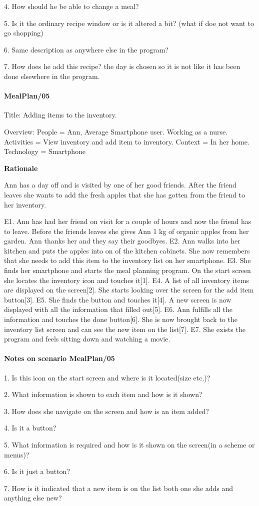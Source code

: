 4. How should he be able to change a meal?

5. Is it the ordinary recipe window or is it altered a bit? (what if doe not want to go shopping) 

6. Same description as anywhere else in the program?

7. How does he add this recipe? the day is chosen so it is not like it has been done elsewhere in the program.

\paragraph{MealPlan/05}

Title: Adding items to the inventory.

Overview:
	People = Ann, Average Smartphone user. Working as a nurse.
	Activities = View inventory and add item to inventory.
	Context = In her home.
	Technology = Smartphone

\textbf{Rationale}

Ann has a day off and is visited by one of her good friends. After the friend leaves she wants to add the fresh apples that she has gotten from the friend to her inventory.

	E1. Ann has had her friend on visit for a couple of hours and now the friend has to leave. Before the friends leaves she gives Ann 1 kg of organic apples from her garden. Ann thanks her and they say their goodbyes.
	E2. Ann walks into her kitchen and puts the apples into on of the kitchen cabinets. She now remembers that she needs to add this item to the inventory list on her smartphone.
	E3. She finds her smartphone and starts the meal planning program. On the start screen she locates the inventory icon and touches it[1].
	E4. A list of all inventory items are displayed on the screen[2]. She starts looking over the screen for the add item button[3].
	E5. She finds the button and touches it[4]. A new screen is now displayed with all the information that filled out[5]. 
	E6. Ann fulfills all the information and touches the done button[6]. She is now brought back to the inventory list screen and can see the new item on the list[7].
	E7. She exists the program and feels sitting down and watching a movie.

\paragraph{Notes on scenario MealPlan/05}
1. Is this icon on the start screen and where is it located(size etc.)?

2. What information is shown to each item and how is it shown?

3. How does she navigate on the screen and how is an item added?

4. Is it a button?

5. What information is required and how is it shown on the screen(in a scheme or menus)?

6. Is it just a button?

7. How is it indicated that a new item is on the list both one she adds and anything else new?